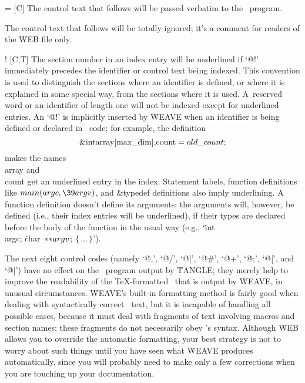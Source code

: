 \@= [C] The control text that follows will
be passed verbatim to the \Cee\ program.

\@q [C,T] The control text that follows will
be totally ignored; it's a comment for readers of the \.{WEB} file only.

\@! [C,T] The section number in an index entry will be underlined if `\.{@!}'
immediately precedes the identifier or control text being indexed. This
convention is used to distinguish the sections where an identifier is
defined, or where it is explained in some special way, from the sections
where it is used. A~reserved word or an identifier of length one will not
be indexed except for underlined entries. An `\.{@!}' is implicitly inserted
by \.{WEAVE} when an identifier is being defined or declared in \Cee\
code; for example, the definition
$$\hbox{\&{int} \\{array}[\\{max\_dim}], \\{count}${}=\\{old\_count};$}$$
makes the names \\{array} and \\{count} get an underlined entry in the
index.  Statement labels, function definitions like
$\\{main}(\\{argc},\39\\{argv})$, and \&{typedef} definitions also
imply underlining. A function definition doesn't define its arguments;
the arguments will, however, be defined
(i.e., their index entries will be underlined), if their types are
declared before the body of the function in the usual way
(e.g., `\.{int}~\\{argc}; \.{char}~${**}\\{argv}$; $\{\,\ldots\,\}$').

\yskip\noindent
The next eight control codes (namely `\.{@,}', `\.{@/}', `\.{@|}', `\.{@\#}',
`\.{@+}', `\.{@;}', `\.{@[}', and `\.{@]}') have no effect on the \Cee\
program output by \.{TANGLE}; they merely help to improve the readability
of the \TeX-formatted \Cee\ that is output by \.{WEAVE}, in unusual
circumstances. \.{WEAVE}'s built-in formatting method is fairly good
when dealing with syntactically correct \Cee\ text, but
it is incapable of handling all possible cases, because it must deal with
fragments of text involving macros and section names; these fragments do
not necessarily obey \Cee's syntax. Although \.{WEB} allows you to
override the automatic formatting, your best strategy is not to worry
about such things until you have seen what \.{WEAVE} produces automatically,
since you will probably need to make only a few corrections when you are
touching up your documentation.

